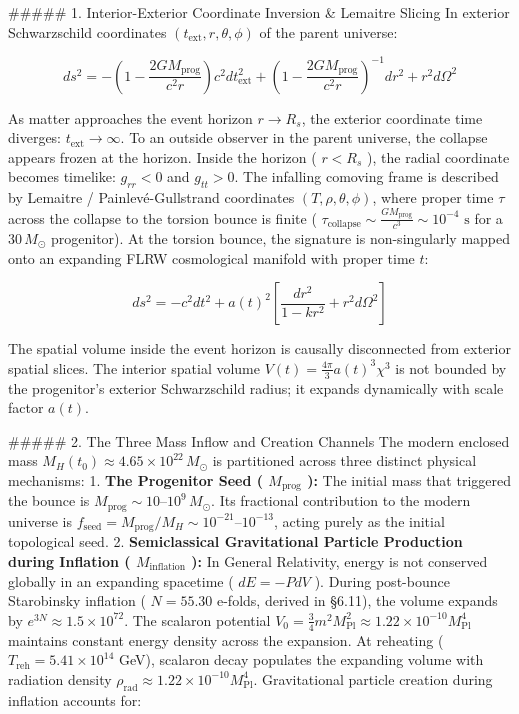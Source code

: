 \documentclass[11pt,a4paper]{article}
\theoremstyle{definition}
\theoremstyle{remark}
\begin{document}
\#\#\#\#\# 1. Interior-Exterior Coordinate Inversion \& Lemaitre Slicing
In exterior Schwarzschild coordinates $(t_{\text{ext}}, r, \theta, \phi)$ of the parent universe:


\begin{equation}
ds^2 = -\left(1 - \frac{2GM_{\text{prog}}}{c^2 r}\right) c^2 dt_{\text{ext}}^2 + \left(1 - \frac{2GM_{\text{prog}}}{c^2 r}\right)^{-1} dr^2 + r^2 d\Omega^2
\end{equation}


As matter approaches the event horizon $r \to R_s$, the exterior coordinate time diverges: $t_{\text{ext}} \to \infty$. To an outside observer in the parent universe, the collapse appears frozen at the horizon.
Inside the horizon ( $r < R_s$ ), the radial coordinate becomes timelike: $g_{rr} < 0$ and $g_{tt} > 0$.
The infalling comoving frame is described by Lemaitre / Painlevé-Gullstrand coordinates $(T, \rho, \theta, \phi)$, where proper time $\tau$ across the collapse to the torsion bounce is finite ( $\tau_{\text{collapse}} \sim \frac{G M_{\text{prog}}}{c^3} \sim 10^{-4}\text{ s}$ for a $30 \, M_\odot$ progenitor).
At the torsion bounce, the signature is non-singularly mapped onto an expanding FLRW cosmological manifold with proper time $t$:


\begin{equation}
ds^2 = -c^2 dt^2 + a(t)^2 \left[ \frac{dr^2}{1 - k r^2} + r^2 d\Omega^2 \right]
\end{equation}


The spatial volume inside the event horizon is causally disconnected from exterior spatial slices. The interior spatial volume $V(t) = \frac{4\pi}{3} a(t)^3 \chi^3$ is not bounded by the progenitor's exterior Schwarzschild radius; it expands dynamically with scale factor $a(t)$.

\#\#\#\#\# 2. The Three Mass Inflow and Creation Channels
The modern enclosed mass $M_H(t_0) \approx 4.65 \times 10^{22} \, M_\odot$ is partitioned across three distinct physical mechanisms:
1. \textbf{The Progenitor Seed ( $M_{\text{prog}}$ ):} The initial mass that triggered the bounce is $M_{\text{prog}} \sim 10\text{--}10^9 \, M_\odot$. Its fractional contribution to the modern universe is $f_{\text{seed}} = M_{\text{prog}} / M_H \sim 10^{-21}\text{--}10^{-13}$, acting purely as the initial topological seed.
2. \textbf{Semiclassical Gravitational Particle Production during Inflation ( $M_{\text{inflation}}$ ):} In General Relativity, energy is not conserved globally in an expanding spacetime ( $dE = -P dV$ ). During post-bounce Starobinsky inflation ( $N = 55.30$ e-folds, derived in \S 6.11), the volume expands by $e^{3N} \approx 1.5 \times 10^{72}$. The scalaron potential $V_0 = \frac{3}{4} m^2 M_{\text{Pl}}^2 \approx 1.22 \times 10^{-10} M_{\text{Pl}}^4$ maintains constant energy density across the expansion. At reheating ( $T_{\text{reh}} = 5.41 \times 10^{14}$ GeV), scalaron decay populates the expanding volume with radiation density $\rho_{\text{rad}} \approx 1.22 \times 10^{-10} M_{\text{Pl}}^4$.
Gravitational particle creation during inflation accounts for:
\end{document}
